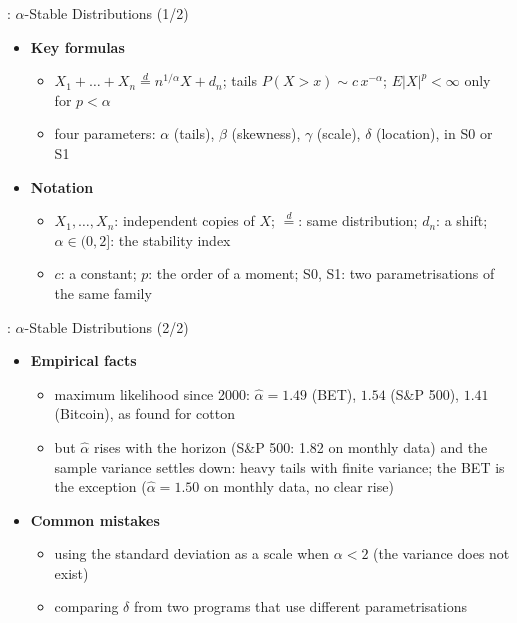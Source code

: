 \begin{frame}{: $\alpha$-Stable Distributions (1/2)}
\itemsize{\small}
\begin{itemize}
    \item \textbf{Key formulas}
    \begin{itemize}
        \item $X_1 + \dots + X_n \overset{d}{=} n^{1/\alpha}X + d_n$; tails $P(X > x) \sim c\,x^{-\alpha}$; $E|X|^p < \infty$ only for $p < \alpha$
        \item four parameters: $\alpha$ (tails), $\beta$ (skewness), $\gamma$ (scale), $\delta$ (location), in S0 or S1 
    \end{itemize}
    \item \textbf{Notation}
    \begin{itemize}
        \item $X_1, \dots, X_n$: independent copies of $X$; $\overset{d}{=}$: same distribution; $d_n$: a shift; $\alpha \in (0, 2]$: the stability index
        \item $c$: a constant; $p$: the order of a moment; S0, S1: two parametrisations of the same family
    \end{itemize}
\end{itemize}
\end{frame}

\begin{frame}{: $\alpha$-Stable Distributions (2/2)}
\itemsize{\small}
\begin{itemize}
    \item \textbf{Empirical facts}
    \begin{itemize}
        \item maximum likelihood since 2000: $\hat\alpha = 1.49$ (BET), $1.54$ (S\&P 500), $1.41$ (Bitcoin), as  found for cotton
        \item but $\hat\alpha$ rises with the horizon (S\&P 500: 1.82 on monthly data) and the sample variance settles down: heavy tails with finite variance; the BET is the exception ($\hat\alpha = 1.50$ on monthly data, no clear rise)
    \end{itemize}
    \item \textbf{Common mistakes}
    \begin{itemize}
        \item using the standard deviation as a scale when $\alpha < 2$ (the variance does not exist)
        \item comparing $\delta$ from two programs that use different parametrisations
    \end{itemize}
\end{itemize}
\end{frame}


